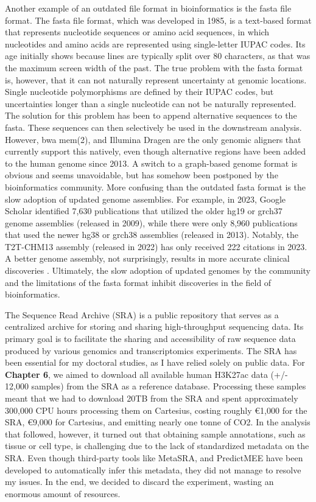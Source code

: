 Another example of an outdated file format in bioinformatics is the fasta file format\cite{Lipman1985}. The fasta file format, which was developed in 1985, is a text-based format that represents nucleotide sequences or amino acid sequences, in which nucleotides and amino acids are represented using single-letter IUPAC codes. Its age initially shows because lines are typically split over 80 characters, as that was the maximum screen width of the past. The true problem with the fasta format is, however, that it can not naturally represent uncertainty at genomic locations. Single nucleotide polymorphisms are defined by their IUPAC codes, but uncertainties longer than a single nucleotide can not be naturally represented. The solution for this problem has been to append alternative sequences to the fasta. These sequences can then selectively be used in the downstream analysis. However, bwa mem(2)\cite{bwamem,bwamem2}, and Illumina Dragen are the only genomic aligners that currently support this natively, even though alternative regions have been added to the human genome since 2013. A switch to a graph-based genome format\cite{Li2020} is obvious and seems unavoidable, but has somehow been postponed by the bioinformatics community. More confusing than the outdated fasta format is the slow adoption of updated genome assemblies. For example, in 2023, Google Scholar identified 7,630 publications that utilized the older hg19 or grch37 genome assemblies (released in 2009), while there were only 8,960 publications that used the newer hg38 or grch38 assemblies (released in 2013). Notably, the T2T-CHM13 assembly (released in 2022) has only received 222 citations in 2023. A better genome assembly, not surprisingly, results in more accurate clinical discoveries \cite{Aganezov2022}. Ultimately, the slow adoption of updated genomes by the community and the limitations of the fasta format inhibit discoveries in the field of bioinformatics.

The Sequence Read Archive (SRA) is a public repository that serves as a centralized archive for storing and sharing high-throughput sequencing data. Its primary goal is to facilitate the sharing and accessibility of raw sequence data produced by various genomics and transcriptomics experiments. The SRA has been essential for my doctoral studies, as I have relied solely on public data. For \textbf{Chapter 6}, we aimed to download all available human H3K27ac data (+/- 12,000 samples) from the SRA as a reference database. Processing these samples meant that we had to download 20TB from the SRA and spent approximately 300,000 CPU hours processing them on Cartesius, costing roughly €1,000 for the SRA\cite{amazon}, €9,000 for Cartesius\cite{cartesius}, and emitting nearly one tonne of CO2\cite{CO2}. In the analysis that followed, however, it turned out that obtaining sample annotations, such as tissue or cell type, is challenging due to the lack of standardized metadata on the SRA. Even though third-party tools like MetaSRA\cite{Bernstein2017}, and PredictMEE\cite{Klie2021} have been developed to automatically infer this metadata, they did not manage to resolve my issues. In the end, we decided to discard the experiment, wasting an enormous amount of resources.

